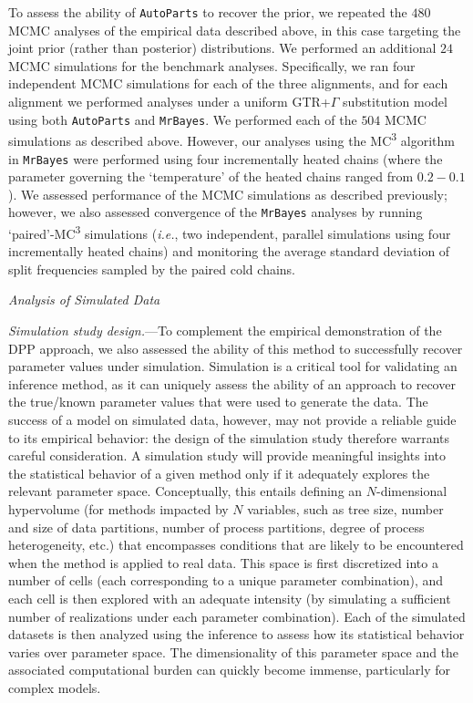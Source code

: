 \documentclass[11pt]{article}
\begin{document}
To assess the ability of \verb!AutoParts! to recover the prior, we repeated the $480$ MCMC analyses of the empirical data described above, in this case targeting the joint prior (rather than posterior) distributions.
We performed an additional $24$ MCMC simulations for the benchmark analyses.
Specifically, we ran four independent MCMC simulations for each of the three alignments, and for each alignment we performed analyses under a uniform GTR+$\Gamma$ substitution model using both \verb!AutoParts! and \verb!MrBayes!.
We performed each of the $504$ MCMC simulations as described above.
However, our analyses using the MC\textsuperscript{3} algorithm in \verb!MrBayes! were performed using four incrementally heated chains (where the parameter governing the `temperature' of the heated chains ranged from ${0.2 - 0.1}$).
We assessed performance of the MCMC simulations as described previously; however, we also assessed convergence of the \verb!MrBayes! analyses by running `paired'-MC\textsuperscript{3} simulations ({\it i.e.}, two independent, parallel simulations using four incrementally heated chains) and monitoring the average standard deviation of split frequencies sampled by the paired cold chains.

\begin{center}
{\it Analysis of Simulated Data}
\end{center}

\noindent
{\it Simulation study design.}---To complement the empirical demonstration of the DPP approach, we also assessed the ability of this method to successfully recover parameter values under simulation.
Simulation is a critical tool for validating an inference method, as it can uniquely assess the ability of an approach to recover the true/known parameter values that were used to generate the data.
The success of a model on simulated data, however, may not provide a reliable guide to its empirical behavior: the design of the simulation study therefore warrants careful consideration.
A simulation study will provide meaningful insights into the statistical behavior of a given method only if it adequately explores the relevant parameter space.
Conceptually, this entails defining an $N$-dimensional hypervolume (for methods impacted by $N$ variables, such as tree size, number and size of data partitions, number of process partitions, degree of process heterogeneity, etc.) that encompasses conditions that are likely to be encountered when the method is applied to real data.
This space is first discretized into a number of cells (each corresponding to a unique parameter combination), and each cell is then explored with an adequate intensity (by simulating a sufficient number of realizations under each parameter combination).
Each of the simulated datasets is then analyzed using the inference to assess how its statistical behavior varies over parameter space. 
The dimensionality of this parameter space and the associated computational burden can quickly become immense, particularly for complex models.
	
\end{document}
